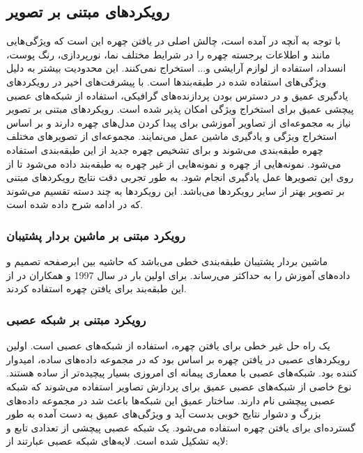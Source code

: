  \subsection{رویکردهای مبتنی بر تصویر}
با توجه به آنچه در \cite{8253595} آمده است، چالش اصلی در یافتن چهره این است که ویژگی‌هایی مانند  و  اطلاعات برجسته چهره را در شرایط مختلف نما، نورپردازی، رنگ پوست، انسداد، استفاده از لوازم آرایشی و... استخراج نمی‌کنند. این محدودیت بیشتر به دلیل ویژگی‌های استفاده شده در طبقه‌بندها است. با پیشرفت‌های اخیر در رویکردهای یادگیری عمیق و در دسترس بودن پردازنده‌های گرافیکی، استفاده از شبکه‌های عصبی پیچشی عمیق برای استخراج ویژگی امکان پذیر شده است. رویکردهای مبتنی بر تصویر نیاز به مجموعه‌ای از تصاویر آموزشی برای پیدا کردن مدل‌های چهره دارند و بر اساس استخراج ویژگی و یادگیری ماشین عمل می‌نمایند. مجموعه‌ای از تصویر‌های مختلف چهره طبقه‌بندی می‌شوند و برای تشخیص چهره جدید از این طبقه‌بندی استفاده می‌شود. نمونه‌هایی از چهره و نمونه‌هایی از غیر چهره به طبقه‌بند داده می‌شود تا از روی این تصویرها عمل یادگیری انجام شود. به طور تجربی دقت نتایج رویکردهای مبتنی بر تصویر بهتر از سایر رویکرد‌ها می‌باشد. این رویکردها به چند دسته تقسیم می‌شوند که در ادامه شرح داده شده است. 

 \subsubsection{رویکرد مبتنی بر ماشین بردار پشتیبان}
ماشین‌ بردار پشتیبان طبقه‌بندی خطی می‌باشد که حاشیه بین ابرصفحه تصمیم و داده‌های آموزش را به حداکثر می‌رساند. برای اولین بار در سال 1997  و همکاران در \cite{609310} از این طبقه‌بند برای یافتن چهره استفاده کردند.

 \subsubsection{رویکرد مبتنی بر شبکه‌ عصبی}
یک راه حل غیر خطی برای یافتن چهره، استفاده از شبکه‌های عصبی  است. اولین رویکردهای عصبی در یافتن چهره بر اساس   بود که در مجموعه داده‌های ساده، امیدوار کننده بود. شبکه‌های عصبی با معماری پیمانه ای  امروزی بسیار پیچیده‌تر از  ساده هستند. نوع خاصی از شبکه‌های عصبی عمیق برای پردازش تصاویر استفاده می‌شوند که شبکه عصبی پیچشی   نام دارند. ساختار عمیق این شبکه‌ها باعث شد در مجموعه داده‌های بزرگ و دشوار نتایج خوبی بدست آید و  ویژگی‌های عمیق به دست آمده به طور گسترده‌ای برای یافتن چهره استفاده می‌شود. یک شبکه عصبی پیچشی از تعدادی تابع و لایه تشکیل شده است. لایه‌های شبکه عصبی عبارتند از:

